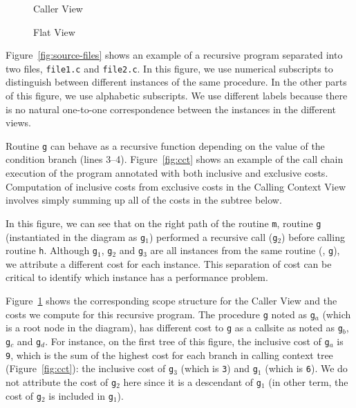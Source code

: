 \begin{figure}
\caption{Caller View}
\label{fig:metrics-callers}
\end{figure}

\begin{figure}
\caption{Flat View}
\label{fig:metrics-flat}
\end{figure}


Figure~\ref{fig:source-files} shows an example of a recursive program separated into two files, \texttt{file1.c} and \texttt{file2.c}.
In this figure, we use numerical subscripts to distinguish between different instances of the same procedure.
In the other parts of this figure, we use alphabetic subscripts.
We use different labels because there is no natural one-to-one correspondence between the instances in the different views.

Routine \texttt{g} can behave as a recursive function depending on the value of the condition branch (lines 3--4).
Figure~\ref{fig:cct} shows an example of the call chain execution of the program annotated with both inclusive and exclusive costs.
Computation of inclusive costs from exclusive costs in the Calling Context View involves simply summing up all of the costs in the subtree below.

In this figure, we can see that on the right path of the routine \texttt{m}, routine \texttt{g} (instantiated in the diagram as \texttt{g$_1$}) performed a recursive call (\texttt{g$_2$}) before calling routine \texttt{h}.
Although \texttt{g$_1$}, \texttt{g$_2$} and \texttt{g$_3$} are all instances from the same routine (\ie{}, \texttt{g}), we attribute a different cost for each instance.
This separation of cost can be critical to identify which instance has a performance problem.

Figure~\ref{fig:metrics-callers} shows the corresponding scope structure for the Caller View and the costs we compute for this recursive program.
The procedure \texttt{g} noted as \texttt{g$_a$} (which is a root node in the diagram), has different cost to \texttt{g} as a callsite as noted as \texttt{g$_b$}, \texttt{g$_c$} and \texttt{g$_d$}.
For instance, on the first tree of this figure, the inclusive cost of \texttt{g$_a$} is \texttt{9}, which is the sum of the highest cost for each branch in calling context tree (Figure~\ref{fig:cct}): the inclusive cost of \texttt{g$_3$} (which is \texttt{3}) and \texttt{g$_1$} (which is \texttt{6}).
We do not attribute the cost of \texttt{g$_2$} here since it is a descendant of \texttt{g$_1$} (in other term, the cost of \texttt{g$_2$} is included in \texttt{g$_1$}).

